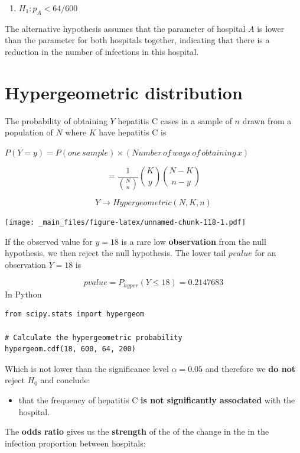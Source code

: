 \documentclass[
]{book}
\providecommand{\tightlist}{%
  \setlength{\itemsep}{0pt}\setlength{\parskip}{0pt}}
\begin{document}
\begin{enumerate}
\def\labelenumi{\alph{enumi}.}
\setcounter{enumi}{1}
\tightlist
\item
  \(H_1: p_A < 64/600\)
\end{enumerate}

The alternative hypothesis assumes that the parameter of hospital \(A\) is lower than the parameter for both hospitals together, indicating that there is a reduction in the number of infections in this hospital.

\hypertarget{hypergeometric-distribution}{%
\section{Hypergeometric distribution}\label{hypergeometric-distribution}}

The probability of obtaining \(Y\) hepatitis C cases in a sample of \(n\) drawn from a population of \(N\) where \(K\) have hepatitis C is

\(P(Y=y)=P(one\,sample) \times (Number\, of\, ways\, of\, obtaining\, x)\)

\[=\frac{1}{\binom N n}\binom K y \binom {N-K} {n-y}\]

\[Y \rightarrow Hypergeometric(N,K,n)\]

\texttt{[image: \_main\_files/figure-latex/unnamed-chunk-118-1.pdf]}

If the observed value for \(y=18\) is a rare low \textbf{observation} from the null hypothesis, we then reject the null hypothesis. The lower tail \(pvalue\) for an observation \(Y=18\) is

\[pvalue=P_{hyper}(Y \leq 18) =0.2147683\]
In Python

\begin{verbatim}
from scipy.stats import hypergeom

# Calculate the hypergeometric probability
hypergeom.cdf(18, 600, 64, 200)
\end{verbatim}

Which is not lower than the significance level \(\alpha=0.05\) and therefore we \textbf{do not} reject \(H_0\) and conclude:

\begin{itemize}
\tightlist
\item
  that the frequency of hepatitis C \textbf{is not significantly associated} with the hospital.
\end{itemize}

The \textbf{odds ratio} gives us the \textbf{strength} of the of the change in the in the infection proportion between hospitals:
\end{document}
